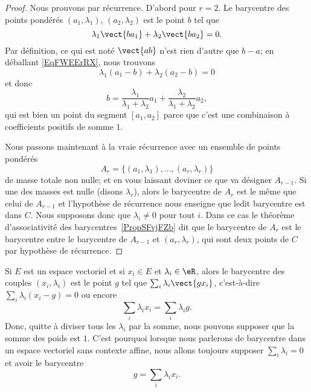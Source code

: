 \begin{proof}
	Nous prouvons par récurrence. D'abord pour \( r=2\). Le barycentre des points pondérés \( (a_1,\lambda_1)\), \( (a_2,\lambda_2)\) est le point \( b\) tel que
	\begin{equation}        \label{EqFWEErRX}
		\lambda_1\vect{ ba_1 }+\lambda_2\vect{ ba_2 }=0.
	\end{equation}
	Par définition, ce qui est noté \( \vect{ ab }\) n'est rien d'autre que \( b-a\); en déballant \eqref{EqFWEErRX}, nous trouvons
	\begin{equation}
		\lambda_1(a_1-b)+\lambda_2(a_2-b)=0
	\end{equation}
	et donc
	\begin{equation}
		b=\frac{ \lambda_1 }{ \lambda_1+\lambda_2 }a_1+\frac{ \lambda_2 }{ \lambda_1+\lambda_2 }a_2,
	\end{equation}
	qui est bien un point du segment \( [a_1,a_2]\) parce que c'est une combinaison à coefficients positifs de somme \( 1\).

	Nous passons maintenant à la vraie récurrence avec un ensemble de points pondérés
	\begin{equation}
		A_r=\{ (a_1,\lambda_1),\ldots, (a_r,\lambda_r) \}
	\end{equation}
	de masse totale non nulle; et en vous laissant deviner ce que va désigner \( A_{r-1}\). Si une des masses est nulle (disons \( \lambda_r\)), alors le barycentre de \( A_r\) est le même que celui de \( A_{r-1}\) et l'hypothèse de récurrence nous enseigne que ledit barycentre est dans \( C\). Nous supposons donc que \( \lambda_i\neq 0\) pour tout \( i\). Dans ce cas le théorème d'associativité des barycentres~\ref{PropSFvjFZb} dit que le barycentre de \( A_r\) est le barycentre entre le barycentre de \( A_{r-1}\) et \( (a_r,\lambda_r)\), qui sont deux points de \( C\) par hypothèse de récurrence.
\end{proof}

Si \( E\) est un espace vectoriel et si \( x_i\in E\) et \( \lambda_i\in \eR\), alors le barycentre des couples \( (x_i,\lambda_i)\) est le point \( g\) tel que \( \sum_i\lambda_i\vect{ gx_i }\), c'est-à-dire \( \sum_i\lambda_i(x_i-g)=0\) ou encore
\begin{equation}
	\sum_i\lambda_ix_i=\sum_i\lambda_ig.
\end{equation}
Donc, quitte à diviser tous les \( \lambda_i\) par la somme, nous pouvons supposer que la somme des poids est \( 1\). C'est pourquoi lorsque nous parlerons de barycentre dans un espace vectoriel sans contexte affine, nous allons toujours supposer \( \sum_i\lambda_i=0\) et avoir le barycentre
\begin{equation}
	g=\sum_i\lambda_ix_i.
\end{equation}

